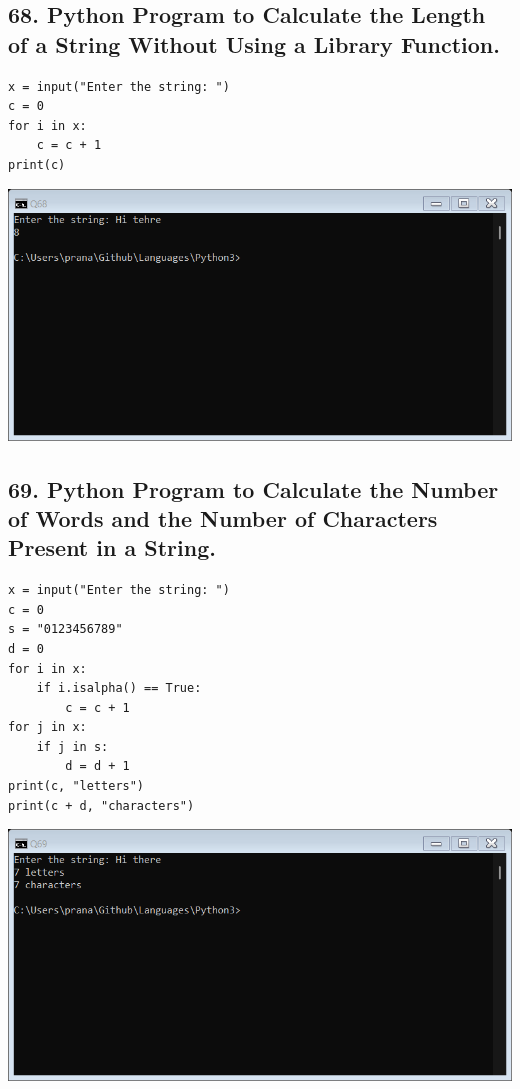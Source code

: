 \documentclass[12pt]{article}
\begin{document}
\subsection*{68. Python Program to Calculate the Length of a String Without Using a Library Function.}
\begin{verbatim}
x = input("Enter the string: ")
c = 0
for i in x:
    c = c + 1
print(c)
\end{verbatim}
\includegraphics[width=\linewidth]{images/68.png}

\subsection*{69. Python Program to Calculate the Number of Words and the Number of Characters Present in a String.}
\begin{verbatim}
x = input("Enter the string: ")
c = 0
s = "0123456789"
d = 0
for i in x:
    if i.isalpha() == True:
        c = c + 1
for j in x:
    if j in s:
        d = d + 1
print(c, "letters")
print(c + d, "characters")
\end{verbatim}
\includegraphics[width=\linewidth]{images/69.png}
\end{document}
